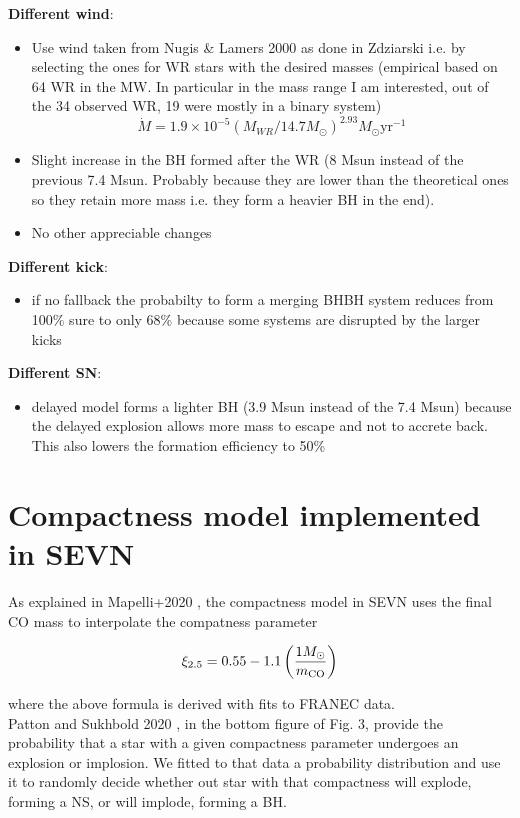 \documentclass[a4paper,titlepage]{book}     	%
\newcommand{\sun}{\ensuremath{_\odot}}
\newcommand{\msun}{\ensuremath{M\sun}}
\newcommand{\yr}{\text{yr}}
\begin{document}
\textbf{Different wind}:\\
\begin{itemize}
	\item Use wind taken from Nugis \& Lamers 2000 as done in Zdziarski i.e. by selecting the ones for WR stars with the desired masses (empirical based on 64 WR in the MW. In particular in the mass range I am interested, out of the 34 observed WR, 19 were mostly in a binary system)
	\[\dot{M} = 1.9\times10^{-5}(M_{WR}/14.7\msun)^{2.93} \msun \yr^{-1}\]
	\item Slight increase in the BH formed after the WR (8 Msun instead of the previous 7.4 Msun. Probably because they are lower than the theoretical ones so they retain more mass i.e. they form a heavier BH in the end). 
	\item No other appreciable changes
\end{itemize}

\textbf{Different kick}:
\begin{itemize}
	\item if no fallback the probabilty to form a merging BHBH system reduces from 100\% sure to only 68\% because some systems are disrupted by the larger kicks
\end{itemize}


\textbf{Different SN}:
\begin{itemize}
	\item delayed model forms a lighter BH (3.9 Msun instead of the 7.4 Msun) because the delayed explosion allows more mass to escape and not to accrete back. This also lowers the formation efficiency to 50\% 
\end{itemize}



\section{Compactness model implemented in SEVN}
As explained in Mapelli+2020 \cite{mapelli2020_compactness}, the compactness model in SEVN uses the final CO mass to interpolate the compatness parameter

\begin{equation}
	\xi_{2.5} = 0.55 -1.1 \left(\frac{1 \msun}{m_{\rm CO}}\right)
\end{equation}

where the above formula is derived with fits to FRANEC data.\\

Patton and Sukhbold 2020 \cite{COcollapse}, in the bottom figure of Fig. 3, provide the probability that a star with a given compactness parameter undergoes an explosion or implosion. We fitted to that data a probability distribution and use it to randomly decide whether out star with that compactness will explode, forming a NS, or will implode, forming a BH.\\
\end{document}
